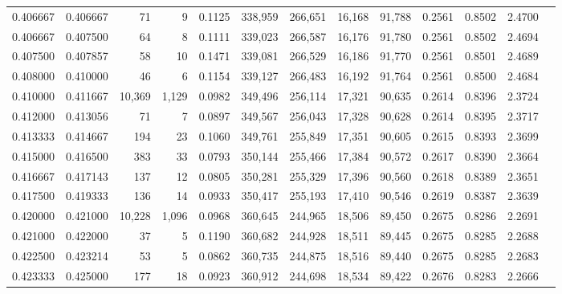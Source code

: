 \begin{tabular}{rrrrrrrrrrrrr}
0.406667 & 0.406667 &     71 &     9 &                                     0.1125 & 338,959 & 266,651 &  16,168 &  91,788 & 0.2561 & 0.8502 & 2.4700 \\
0.406667 & 0.407500 &     64 &     8 &                                     0.1111 & 339,023 & 266,587 &  16,176 &  91,780 & 0.2561 & 0.8502 & 2.4694 \\
0.407500 & 0.407857 &     58 &    10 &                                     0.1471 & 339,081 & 266,529 &  16,186 &  91,770 & 0.2561 & 0.8501 & 2.4689 \\
0.408000 & 0.410000 &     46 &     6 &                                     0.1154 & 339,127 & 266,483 &  16,192 &  91,764 & 0.2561 & 0.8500 & 2.4684 \\
0.410000 & 0.411667 & 10,369 & 1,129 &                                     0.0982 & 349,496 & 256,114 &  17,321 &  90,635 & 0.2614 & 0.8396 & 2.3724 \\
0.412000 & 0.413056 &     71 &     7 &                                     0.0897 & 349,567 & 256,043 &  17,328 &  90,628 & 0.2614 & 0.8395 & 2.3717 \\
0.413333 & 0.414667 &    194 &    23 &                                     0.1060 & 349,761 & 255,849 &  17,351 &  90,605 & 0.2615 & 0.8393 & 2.3699 \\
0.415000 & 0.416500 &    383 &    33 &                                     0.0793 & 350,144 & 255,466 &  17,384 &  90,572 & 0.2617 & 0.8390 & 2.3664 \\
0.416667 & 0.417143 &    137 &    12 &                                     0.0805 & 350,281 & 255,329 &  17,396 &  90,560 & 0.2618 & 0.8389 & 2.3651 \\
0.417500 & 0.419333 &    136 &    14 &                                     0.0933 & 350,417 & 255,193 &  17,410 &  90,546 & 0.2619 & 0.8387 & 2.3639 \\
0.420000 & 0.421000 & 10,228 & 1,096 &                                     0.0968 & 360,645 & 244,965 &  18,506 &  89,450 & 0.2675 & 0.8286 & 2.2691 \\
0.421000 & 0.422000 &     37 &     5 &                                     0.1190 & 360,682 & 244,928 &  18,511 &  89,445 & 0.2675 & 0.8285 & 2.2688 \\
0.422500 & 0.423214 &     53 &     5 &                                     0.0862 & 360,735 & 244,875 &  18,516 &  89,440 & 0.2675 & 0.8285 & 2.2683 \\
0.423333 & 0.425000 &    177 &    18 &                                     0.0923 & 360,912 & 244,698 &  18,534 &  89,422 & 0.2676 & 0.8283 & 2.2666 \\

\end{tabular}
